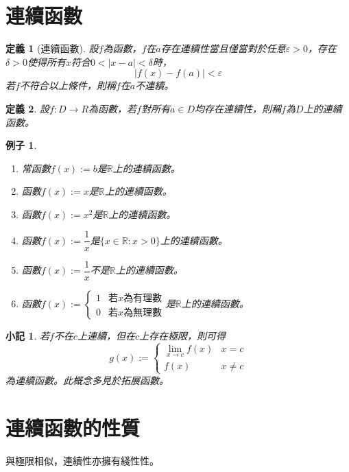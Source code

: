 \documentclass[12pt]{article}
\newtheorem{definition}{定義}
\newtheorem*{remark}{小記}
\newtheorem*{example}{例子}
\begin{document}
    \section*{連續函數}
    \begin{definition}[連續函數]
        設$f$為函數，$f$在$a$存在連續性當且僅當對於任意$\varepsilon>0$，存在$\delta>0$使得所有$x$符合$0<|x-a|<\delta$時，$$|f(x)-f(a)|<\varepsilon$$ 若$f$不符合以上條件，則稱$f$在$a$不連續。
    \end{definition}
    \begin{definition}
        設$f:D\to R$為函數，若$f$對所有$a\in D$均存在連續性，則稱$f$為$D$上的連續函數。
    \end{definition}
    \begin{example}
        \begin{enumerate}
            \item 常函數$f(x):=b$是$\mathbb{R}$上的連續函數。
            \item 函數$f(x):=x$是$\mathbb{R}$上的連續函數。
            \item 函數$f(x):=x^2$是$\mathbb{R}$上的連續函數。
            \item 函數$f(x):=\dfrac{1}{x}$是$\{x\in\mathbb{R}:x>0\}$上的連續函數。
            \item 函數$f(x):=\dfrac{1}{x}$不是$\mathbb{R}$上的連續函數。
            \item 函數$f(x):=\begin{cases}
                1&\textrm{若}x\textrm{為有理數}\\
                0&\textrm{若}x\textrm{為無理數}
            \end{cases}$是$\mathbb{R}$上的連續函數。
        \end{enumerate}
    \end{example}
    \begin{remark}
        若$f$不在$c$上連續，但在$c$上存在極限，則可得$$g(x):=\begin{cases}
            \lim_{x\to c}f(x) & x=c\\
            f(x) & x\neq c
        \end{cases}$$ 為連續函數。此概念多見於拓展函數。
    \end{remark}
    \section*{連續函數的性質}

    與極限相似，連續性亦擁有綫性性。
\end{document}

